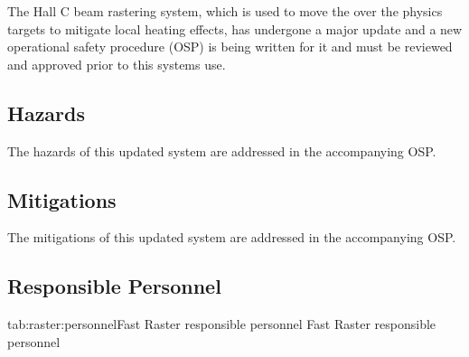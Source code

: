 


\begin{safetyen}{0}{0}

The Hall C beam rastering system, which is used to move the over the physics targets to
mitigate local heating effects, has undergone a major update and a new operational
safety procedure (OSP) is being written for it and must be reviewed and approved prior
to this systems use.

\subsection{Hazards}

The hazards of this updated system are addressed in the accompanying OSP.

\subsection{Mitigations}

The mitigations of this updated system are addressed in the accompanying OSP.

\subsection{Responsible Personnel}

\begin{namestab}{tab:raster:personnel}{Fast Raster responsible personnel}{%
          Fast Raster responsible personnel}
\end{namestab}
\end{safetyen}

